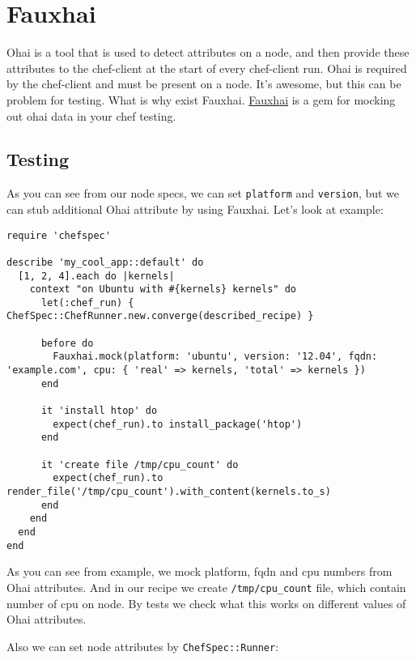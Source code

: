 \section{Fauxhai}
\label{sec:testing-fauxhai}

Ohai is a tool that is used to detect attributes on a node, and then provide these attributes to the chef-client at the start of every chef-client run. Ohai is required by the chef-client and must be present on a node. It's awesome, but this can be problem for testing. What is why exist Fauxhai. \href{http://technology.customink.com/fauxhai/}{Fauxhai} is a gem for mocking out ohai data in your chef testing.

\subsection{Testing}

As you can see from our node specs, we can set \lstinline!platform! and \lstinline!version!, but we can stub additional Ohai attribute by using Fauxhai. Let's look at example:

\begin{lstlisting}[label=lst:testing-fauxhai1]
require 'chefspec'

describe 'my_cool_app::default' do
  [1, 2, 4].each do |kernels|
    context "on Ubuntu with #{kernels} kernels" do
      let(:chef_run) { ChefSpec::ChefRunner.new.converge(described_recipe) }

      before do
        Fauxhai.mock(platform: 'ubuntu', version: '12.04', fqdn: 'example.com', cpu: { 'real' => kernels, 'total' => kernels })
      end

      it 'install htop' do
        expect(chef_run).to install_package('htop')
      end

      it 'create file /tmp/cpu_count' do
        expect(chef_run).to render_file('/tmp/cpu_count').with_content(kernels.to_s)
      end
    end
  end
end
\end{lstlisting}

As you can see from example, we mock platform, fqdn and cpu numbers from Ohai attributes. And in our recipe we create \lstinline!/tmp/cpu_count! file, which contain number of cpu on node. By tests we check what this works on different values of Ohai attributes.

Also we can set node attributes by \lstinline!ChefSpec::Runner!:

